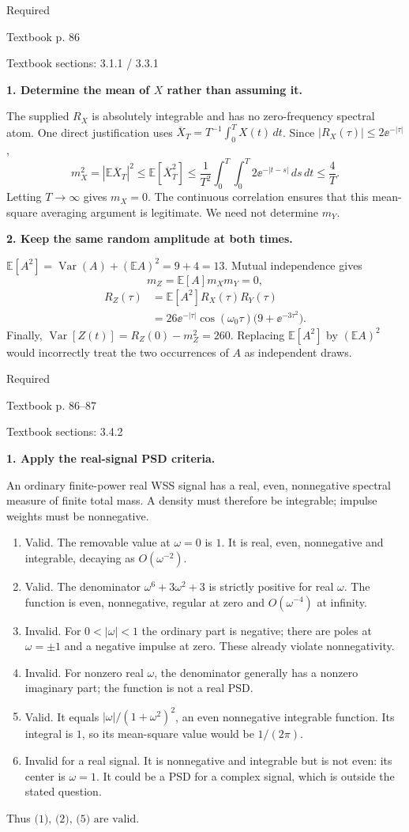 \documentclass[11pt]{article}
\newcommand{\E}{\mathbb E}\newcommand{\Var}{\operatorname{Var}}\newcommand{\Cov}{\operatorname{Cov}}
\newcommand{\problem}[3]{\par\addvspace{1em}\Needspace{8\baselineskip}{\LARGE\bfseries Exercise #1}\hfill #2\par{\small\color{gray}Textbook p. #3}\par\vspace{3mm}}
\newcommand{\step}[1]{\par\Needspace{6\baselineskip}\textbf{#1}\par}
\begin{document}
\problem{3.16}{Required}{86}
{\small Textbook sections: 3.1.1 / 3.3.1}
\step{1. Determine the mean of $X$ rather than assuming it.}
The supplied $R_X$ is absolutely integrable and has no zero-frequency spectral atom. One direct justification uses $\overline X_T=T^{-1}\int_0^T X(t)\,dt$. Since $|R_X(\tau)|\le2\ee^{-|\tau|}$,
\[m_X^2=|\E\overline X_T|^2\le\E[\overline X_T^2]
\le\frac1{T^2}\int_0^T\!\int_0^T2\ee^{-|t-s|}\,ds\,dt\le\frac4T.\]
Letting $T\to\infty$ gives $m_X=0$. The continuous correlation ensures that this mean-square averaging argument is legitimate. We need not determine $m_Y$.
\step{2. Keep the same random amplitude at both times.}
$\E[A^2]=\Var(A)+(\E A)^2=9+4=13$. Mutual independence gives
\[\boxed{m_Z=\E[A]m_Xm_Y=0},\]
\[\begin{aligned}
R_Z(\tau)&=\E[A^2]R_X(\tau)R_Y(\tau)\\
&=\boxed{26\ee^{-|\tau|}\cos(\omega_0\tau)\bigl(9+\ee^{-3\tau^2}\bigr)}.
\end{aligned}\]
Finally, $\boxed{\Var[Z(t)]=R_Z(0)-m_Z^2=260}$. Replacing $\E[A^2]$ by $(\E A)^2$ would incorrectly treat the two occurrences of $A$ as independent draws.

\problem{3.21}{Required}{86--87}
{\small Textbook sections: 3.4.2}
\step{1. Apply the real-signal PSD criteria.}
An ordinary finite-power real WSS signal has a real, even, nonnegative spectral measure of finite total mass. A density must therefore be integrable; impulse weights must be nonnegative.
\begin{enumerate}
\item Valid. The removable value at $\omega=0$ is $1$. It is real, even, nonnegative and integrable, decaying as $O(\omega^{-2})$.
\item Valid. The denominator $\omega^6+3\omega^2+3$ is strictly positive for real $\omega$. The function is even, nonnegative, regular at zero and $O(\omega^{-4})$ at infinity.
\item Invalid. For $0<|\omega|<1$ the ordinary part is negative; there are poles at $\omega=\pm1$ and a negative impulse at zero. These already violate nonnegativity.
\item Invalid. For nonzero real $\omega$, the denominator generally has a nonzero imaginary part; the function is not a real PSD.
\item Valid. It equals $|\omega|/(1+\omega^2)^2$, an even nonnegative integrable function. Its integral is $1$, so its mean-square value would be $1/(2\pi)$.
\item Invalid for a real signal. It is nonnegative and integrable but is not even: its center is $\omega=1$. It could be a PSD for a complex signal, which is outside the stated question.
\end{enumerate}
Thus $\boxed{\text{(1), (2), (5) are valid.}}$
\end{document}

